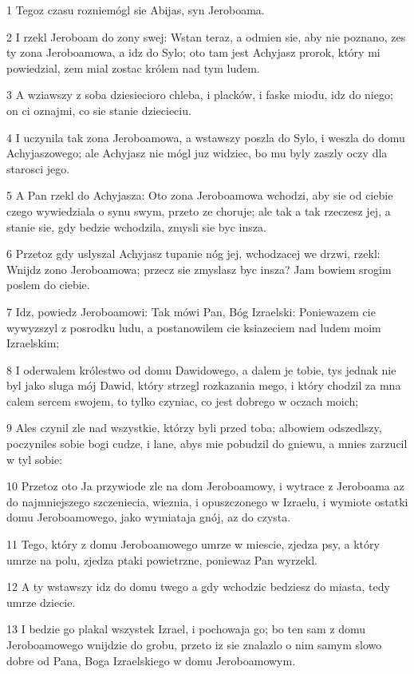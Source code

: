 \par 1 Tegoz czasu rozniemógl sie Abijas, syn Jeroboama.
\par 2 I rzekl Jeroboam do zony swej: Wstan teraz, a odmien sie, aby nie poznano, zes ty zona Jeroboamowa, a idz do Sylo; oto tam jest Achyjasz prorok, który mi powiedzial, zem mial zostac królem nad tym ludem.
\par 3 A wziawszy z soba dziesiecioro chleba, i placków, i faske miodu, idz do niego; on ci oznajmi, co sie stanie dziecieciu.
\par 4 I uczynila tak zona Jeroboamowa, a wstawszy poszla do Sylo, i weszla do domu Achyjaszowego; ale Achyjasz nie mógl juz widziec, bo mu byly zaszly oczy dla starosci jego.
\par 5 A Pan rzekl do Achyjasza: Oto zona Jeroboamowa wchodzi, aby sie od ciebie czego wywiedziala o synu swym, przeto ze choruje; ale tak a tak rzeczesz jej, a stanie sie, gdy bedzie wchodzila, zmysli sie byc insza.
\par 6 Przetoz gdy uslyszal Achyjasz tupanie nóg jej, wchodzacej we drzwi, rzekl: Wnijdz zono Jeroboamowa; przecz sie zmyslasz byc insza? Jam bowiem srogim poslem do ciebie.
\par 7 Idz, powiedz Jeroboamowi: Tak mówi Pan, Bóg Izraelski: Poniewazem cie wywyzszyl z posrodku ludu, a postanowilem cie ksiazeciem nad ludem moim Izraelskim;
\par 8 I oderwalem królestwo od domu Dawidowego, a dalem je tobie, tys jednak nie byl jako sluga mój Dawid, który strzegl rozkazania mego, i który chodzil za mna calem sercem swojem, to tylko czyniac, co jest dobrego w oczach moich;
\par 9 Ales czynil zle nad wszystkie, którzy byli przed toba; albowiem odszedlszy, poczyniles sobie bogi cudze, i lane, abys mie pobudzil do gniewu, a mnies zarzucil w tyl sobie:
\par 10 Przetoz oto Ja przywiode zle na dom Jeroboamowy, i wytrace z Jeroboama az do najmniejszego szczeniecia, wieznia, i opuszczonego w Izraelu, i wymiote ostatki domu Jeroboamowego, jako wymiataja gnój, az do czysta.
\par 11 Tego, który z domu Jeroboamowego umrze w miescie, zjedza psy, a który umrze na polu, zjedza ptaki powietrzne, poniewaz Pan wyrzekl.
\par 12 A ty wstawszy idz do domu twego a gdy wchodzic bedziesz do miasta, tedy umrze dziecie.
\par 13 I bedzie go plakal wszystek Izrael, i pochowaja go; bo ten sam z domu Jeroboamowego wnijdzie do grobu, przeto iz sie znalazlo o nim samym slowo dobre od Pana, Boga Izraelskiego w domu Jeroboamowym.
